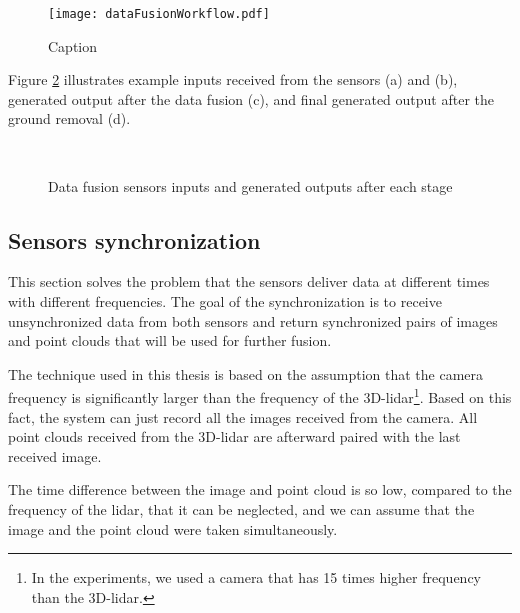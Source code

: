 \begin{figure}[htpb]
    \centering
    \texttt{[image: dataFusionWorkflow.pdf]}
    \caption{Caption} \label{fig:dataFusionWorkflow}
\end{figure}

Figure \ref{fig:dataFusionExample} illustrates example inputs received from the sensors (a) and (b), generated output after the data fusion (c), and final generated output after the ground removal (d).

\begin{figure}[!tbp]
    \centering
    \hfill
    \\
    \hfill
    \caption{Data fusion sensors inputs and generated outputs after each stage}
    \label{fig:dataFusionExample}
\end{figure}

\subsection{Sensors synchronization}

This section solves the problem that the sensors deliver data at different times with different frequencies. The goal of the synchronization is to receive unsynchronized data from both sensors and return synchronized pairs of images and point clouds that will be used for further fusion.\par
The technique used in this thesis is based on the assumption that the camera frequency is significantly larger than the frequency of the 3D-lidar\footnote{In the experiments, we used a camera that has 15 times higher frequency than the 3D-lidar.}. Based on this fact, the system can just record all the images received from the camera. All point clouds received from the 3D-lidar are afterward paired with the last received image.\par
The time difference between the image and point cloud is so low, compared to the frequency of the lidar, that it can be neglected, and we can assume that the image and the point cloud were taken simultaneously.

